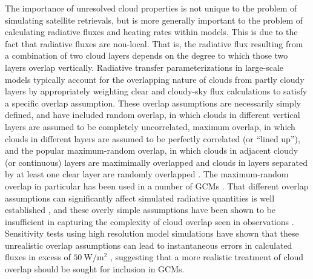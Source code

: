 The importance of unresolved cloud properties is not unique to the
problem of simulating satellite retrievals, but is more generally
important to the problem of calculating radiative fluxes and heating
rates within models. This is due to the fact that radiative fluxes are
non-local. That is, the radiative flux resulting from a combination of
two cloud layers depends on the degree to which those two layers overlap
vertically. Radiative transfer parameterizations in large-scale models
typically account for the overlapping nature of clouds from partly
cloudy layers by appropriately weighting clear and cloudy-sky flux
calculations to satisfy a specific overlap assumption. These overlap
assumptions are necessarily simply defined, and have included random
overlap, in which clouds in different vertical layers are assumed to be
completely uncorrelated, maximum overlap, in which clouds in different
layers are assumed to be perfectly correlated (or ``lined up''), and the
popular maximum-random overlap, in which clouds in adjacent cloudy (or
continuous) layers are maximimally overlapped and clouds in layers
separated by at least one clear layer are randomly overlapped
\citep{geleyn_and_hollingsworth_1979, tian_and_curry_1989}. The
maximum-random overlap in particular has been used in a number of GCMs
\citep[e.g.,][]{collins_et_al_2004, neale_et_al_2010a, neale_et_al_2010b}.
That different overlap assumptions can significantly affect simulated
radiative quantities is well established
\citep[e.g.,][]{morcrette_and_fouquart_1986, stubenrauch_et_al_1997, barker_et_al_1999},
and these overly simple assumptions have been shown to be insufficient
in capturing the complexity of cloud overlap seen in observations
\citep{hogan_and_illingworth_2000, mace_and_benson-troth_2002, barker_2008}.
Sensitivity tests using high resolution model simulations have shown
that these unrealistic overlap assumptions can lead to instantaneous
errors in calculated fluxes in excess of \(50~\textrm{W}/\textrm{m}^2\)
\citep{barker_et_al_1999, wu_and_liang_2005}, suggesting that a more
realistic treatment of cloud overlap should be sought for inclusion in
GCMs.


